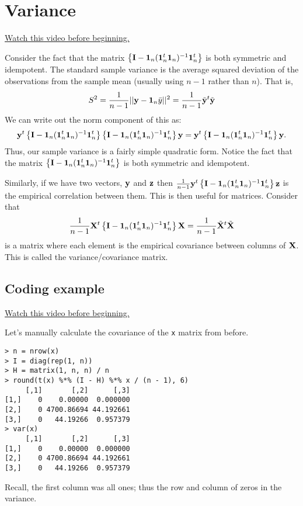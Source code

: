 \section{Variance}

\href{https://www.youtube.com/watch?v=hTVkDOojbdw&index=5&list=PLpl-gQkQivXhdgUCdaUQcdb31CRe8Mm2y}{Watch this video before beginning.}


Consider the fact that the matrix $\left\{ \mathbf{I} - \mathbf{1}_n (\mathbf{1}_n^t \mathbf{1}_n)^{-1} \mathbf{1}_n^t \right\}$
is both symmetric and idempotent. The standard sample variance is the average squared deviation of the
observations from the sample mean (usually using $n-1$ rather than $n$). That is,
$$
S^2 = \frac{1}{n-1}|| \mathbf{y} -  \mathbf{1}_n \bar y||^2 = \frac{1}{n-1} \tilde {\mathbf{y}}^t \tilde {\mathbf{y}}
$$
We can write out the norm component of this as: 
$$
\mathbf{y}^t \left\{ \mathbf{I} - \mathbf{1}_n (\mathbf{1}_n^t \mathbf{1}_n)^{-1} \mathbf{1}_n^t \right\}
\left\{ \mathbf{I} - \mathbf{1}_n (\mathbf{1}_n^t \mathbf{1}_n)^{-1} \mathbf{1}_n^t \right\} \mathbf{y}
= \mathbf{y}^t \left\{ \mathbf{I} - \mathbf{1}_n (\mathbf{1}_n^t \mathbf{1}_n)^{-1} \mathbf{1}_n^t \right\}\mathbf{y}.
$$
Thus, our sample variance is a fairly simple quadratic form. 
Notice the fact that the matrix $\left\{ \mathbf{I} - \mathbf{1}_n (\mathbf{1}_n^t \mathbf{1}_n)^{-1} \mathbf{1}_n^t \right\}$
is both symmetric and idempotent.

Similarly, if we have two vectors, $\mathbf{y}$ and $\mathbf{z}$ then $\frac{1}{n-1}\mathbf{y}^t \left\{ \mathbf{I} - \mathbf{1}_n (\mathbf{1}_n^t \mathbf{1}_n)^{-1} \mathbf{1}_n^t \right\} \mathbf{z}$ is the
empirical correlation between them.
This is then useful for matrices. Consider that
$$
\frac{1}{n-1} \mathbf{X}^t \left\{ \mathbf{I} - \mathbf{1}_n (\mathbf{1}_n^t \mathbf{1}_n)^{-1} \mathbf{1}_n^t \right\} \mathbf{X}
= \frac{1}{n-1} \tilde {\mathbf{X}}^t \tilde {\mathbf{X}}
$$
is a matrix where each element is the empirical covariance between columns of $\mathbf{X}$.
This is called the variance/covariance matrix. 

\subsection{Coding example}

\href{https://www.youtube.com/watch?v=_AHZIy8PRmU&list=PLpl-gQkQivXhdgUCdaUQcdb31CRe8Mm2y&index=6}{Watch this video before beginning.}

Let's manually calculate the covariance of the \texttt{x} matrix from before.

\begin{verbatim}
> n = nrow(x)
> I = diag(rep(1, n))
> H = matrix(1, n, n) / n
> round(t(x) %*% (I - H) %*% x / (n - 1), 6)
     [,1]       [,2]      [,3]
[1,]    0    0.00000  0.000000
[2,]    0 4700.86694 44.192661
[3,]    0   44.19266  0.957379
> var(x)
     [,1]       [,2]      [,3]
[1,]    0    0.00000  0.000000
[2,]    0 4700.86694 44.192661
[3,]    0   44.19266  0.957379
\end{verbatim}
Recall, the first column was all ones; thus the row and column of zeros in the variance.





